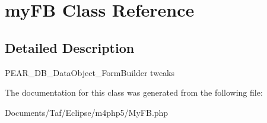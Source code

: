 \hypertarget{classmyFB}{
\section{myFB Class Reference}
\label{classmyFB}
}


\subsection{Detailed Description}
PEAR\_\-DB\_\-DataObject\_\-FormBuilder tweaks 

The documentation for this class was generated from the following file:\begin{CompactItemize}
\item 
Documents/Taf/Eclipse/m4php5/MyFB.php\end{CompactItemize}
